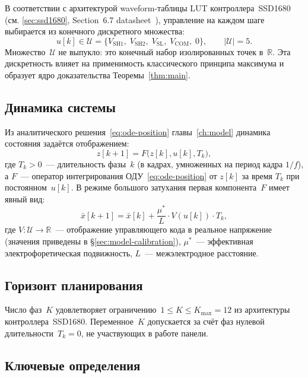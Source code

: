 В соответствии с архитектурой waveform-таблицы LUT контроллера~SSD1680
(см. \ref{sec:ssd1680}, Section~6.7 datasheet~\cite{ssd1680_datasheet}),
управление на каждом шаге выбирается из конечного дискретного множества:
\begin{equation}\label{eq:action-set}
    u[k] \in \mathcal{U} = \{V_{\!\mathrm{SH1}},\; V_{\!\mathrm{SH2}},\;
        V_{\!\mathrm{SL}},\; V_{\!\mathrm{COM}},\; 0\},
    \qquad |\mathcal{U}| = 5.
\end{equation}
Множество~$\mathcal{U}$ не выпукло: это конечный набор
изолированных точек в~$\mathbb{R}$. Эта дискретность влияет на применимость
классического принципа максимума и образует ядро доказательства
Теоремы~\ref{thm:main}.

\subsection*{Динамика системы}

Из аналитического решения~\eqref{eq:ode-position} главы~\ref{ch:model}
динамика состояния задаётся отображением:
\begin{equation}\label{eq:dynamics}
    z[k+1] = F\bigl(z[k], u[k], T_k\bigr),
\end{equation}
где $T_k > 0$~--- длительность фазы~$k$ (в кадрах, умноженных на период
кадра $1/f$), а $F$~--- оператор интегрирования ОДУ~\eqref{eq:ode-position}
от $z[k]$ за время $T_k$ при постоянном~$u[k]$. В режиме большого
затухания первая компонента~$F$ имеет явный вид:
\begin{equation}\label{eq:dynamics-explicit}
    \bar{x}[k+1] = \bar{x}[k] + \frac{\mu^*}{L} \cdot V(u[k]) \cdot T_k,
\end{equation}
где $V : \mathcal{U} \to \mathbb{R}$~--- отображение управляющего кода в
реальное напряжение (значения приведены в \S\ref{sec:model-calibration}),
$\mu^*$~--- эффективная электрофоретическая подвижность, $L$~---
межэлектродное расстояние.

\subsection*{Горизонт планирования}

Число фаз~$K$ удовлетворяет ограничению~$1 \le K \le K_{\max} = 12$
из архитектуры контроллера~SSD1680. Переменное~$K$ допускается
за счёт фаз нулевой длительности~$T_k = 0$, не участвующих в работе панели.

\subsection*{Ключевые определения}

